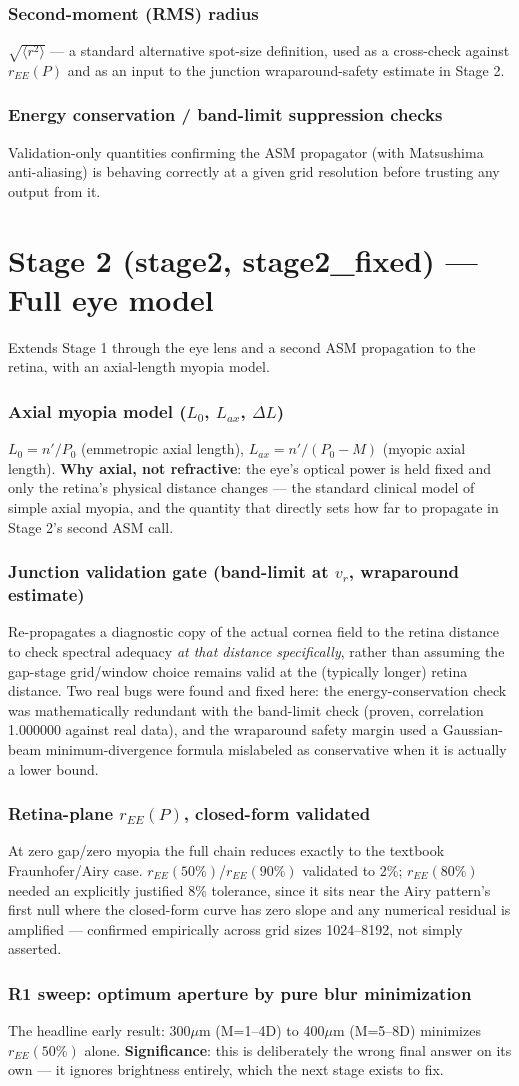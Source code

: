 \documentclass[10pt]{report}
\newcommand{\feat}[1]{\subsection*{#1}}
\begin{document}
\feat{Second-moment (RMS) radius}
$\sqrt{\langle r^2\rangle}$ --- a standard alternative spot-size definition, used as a cross-check against $r_{EE}(P)$ and as an input to the junction wraparound-safety estimate in Stage 2.

\feat{Energy conservation / band-limit suppression checks}
Validation-only quantities confirming the ASM propagator (with Matsushima anti-aliasing) is behaving correctly at a given grid resolution before trusting any output from it.

\chapter{Stage 2 (stage2, stage2\_fixed) --- Full eye model}
Extends Stage 1 through the eye lens and a second ASM propagation to the retina, with an axial-length myopia model.

\feat{Axial myopia model ($L_0$, $L_{ax}$, $\Delta L$)}
$L_0 = n'/P_0$ (emmetropic axial length), $L_{ax} = n'/(P_0-M)$ (myopic axial length). \textbf{Why axial, not refractive}: the eye's optical power is held fixed and only the retina's physical distance changes --- the standard clinical model of simple axial myopia, and the quantity that directly sets how far to propagate in Stage 2's second ASM call.

\feat{Junction validation gate (band-limit at $v_r$, wraparound estimate)}
Re-propagates a diagnostic copy of the actual cornea field to the retina distance to check spectral adequacy \emph{at that distance specifically}, rather than assuming the gap-stage grid/window choice remains valid at the (typically longer) retina distance. Two real bugs were found and fixed here: the energy-conservation check was mathematically redundant with the band-limit check (proven, correlation 1.000000 against real data), and the wraparound safety margin used a Gaussian-beam minimum-divergence formula mislabeled as conservative when it is actually a lower bound.

\feat{Retina-plane $r_{EE}(P)$, closed-form validated}
At zero gap/zero myopia the full chain reduces exactly to the textbook Fraunhofer/Airy case. $r_{EE}(50\%)$/$r_{EE}(90\%)$ validated to 2\%; $r_{EE}(80\%)$ needed an explicitly justified 8\% tolerance, since it sits near the Airy pattern's first null where the closed-form curve has zero slope and any numerical residual is amplified --- confirmed empirically across grid sizes 1024--8192, not simply asserted.

\feat{R1 sweep: optimum aperture by pure blur minimization}
The headline early result: 300$\mu$m (M=1--4D) to 400$\mu$m (M=5--8D) minimizes $r_{EE}(50\%)$ alone. \textbf{Significance}: this is deliberately the wrong final answer on its own --- it ignores brightness entirely, which the next stage exists to fix.
\end{document}
